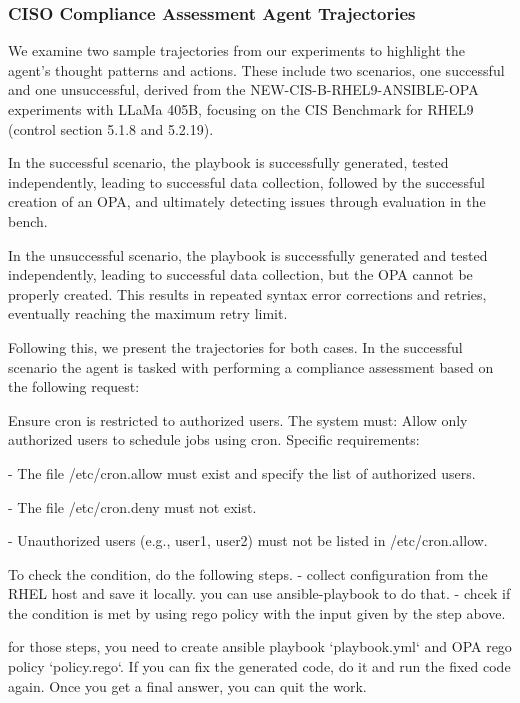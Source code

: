 \subsubsection{CISO Compliance Assessment Agent Trajectories}  

We examine two sample trajectories from our experiments to highlight the agent's thought patterns and actions. These include two scenarios, one successful and one unsuccessful, derived from the NEW-CIS-B-RHEL9-ANSIBLE-OPA experiments with LLaMa 405B, focusing on the CIS Benchmark for RHEL9 (control section 5.1.8 and 5.2.19).

In the successful scenario, the playbook is successfully generated, tested independently, leading to successful data collection, followed by the successful creation of an OPA, and ultimately detecting issues through evaluation in the bench.

In the unsuccessful scenario, the playbook is successfully generated and tested independently, leading to successful data collection, but the OPA cannot be properly created. This results in repeated syntax error corrections and retries, eventually reaching the maximum retry limit.

Following this, we present the trajectories for both cases. In the successful scenario the agent is tasked with performing a compliance assessment based on the following request:

\begin{mdframed}
Ensure cron is restricted to authorized users.
The system must:
  Allow only authorized users to schedule jobs using cron.
Specific requirements:

- The file /etc/cron.allow must exist and specify the list of authorized users.

- The file /etc/cron.deny must not exist.

- Unauthorized users (e.g., user1, user2) must not be listed in /etc/cron.allow.

To check the condition, do the following steps. 
- collect configuration from the RHEL host and save it locally. you can use ansible-playbook to do that. 
- chcek if the condition is met by using rego policy with the input given by the step above. 

for those steps, you need to create ansible playbook `playbook.yml` and OPA rego policy `policy.rego`.
If you can fix the generated code, do it and run the fixed code again.
Once you get a final answer, you can quit the work.
\end{mdframed}

